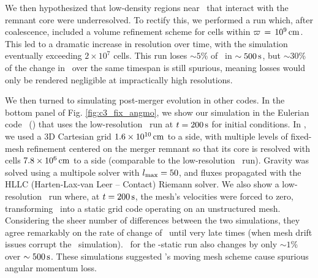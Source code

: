 
We then hypothesized that low-density regions near \innercyl\ that interact with the remnant core were underresolved. To rectify this, we performed a run which, after coalescence, included a volume refinement scheme for cells within $\varpi\,=\,10^9\,\mathrm{cm}$.  This led to a dramatic increase in resolution over time, with the simulation eventually exceeding $2\times10^7$ cells.  This run loses $\sim5$\% of \Lztot\ in $\sim500\,\mathrm{s}$, but $\sim30$\% of the change in \Lzinner\ over the same timespan is still spurious, meaning losses would only be rendered negligible at impractically high resolutions.




We then turned to simulating post-merger evolution in other codes.  In the bottom panel of Fig. \ref{fig:c3_fix_angmo}, we show our simulation in the Eulerian code \flash\ (\citealt{fryx+00, dube+09}) that uses the low-resolution \arepo\ run at $t = 200\,\mathrm{s}$ for initial conditions.  In \flash, we used a 3D Cartesian grid $1.6\times10^{10}\,\mathrm{cm}$ to a side, with multiple levels of fixed-mesh refinement centered on the merger remnant so that its core is resolved with cells $7.8\times10^6\,\mathrm{cm}$ to a side (comparable to the low-resolution \arepo\ run).  Gravity was solved using a multipole solver with $l_\mathrm{max} = 50$, and fluxes propagated with the HLLC (Harten-Lax-van Leer -- Contact) Riemann solver.  We also show a low-resolution \arepo\ run where, at $t = 200\,\mathrm{s}$, the mesh's velocities were forced to zero, transforming \arepo\ into a static grid code operating on an unstructured mesh.  Considering the sheer number of differences between the two simulations, they agree remarkably on the rate of change of \Lzinner\ until very late times (when mesh drift issues corrupt the \arepo\ simulation).  \Lztot\ for the \arepo-static run also changes by only $\sim1$\% over $\sim500\,\mathrm{s}$.  These simulations suggested \arepo's moving mesh scheme cause spurious angular momentum loss.

